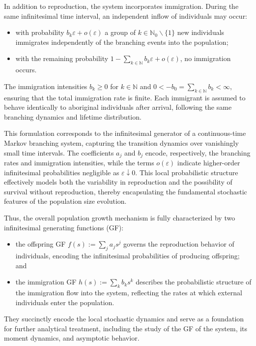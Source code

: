 \documentclass[10pt,reqno]{amsart}
\theoremstyle{definition}
\numberwithin{equation}{section}
\begin{document}
    In addition to reproduction, the system incorporates immigration. During the same infinitesimal
    time interval, an independent inflow of individuals may occur:
\begin{itemize}
\item with probability $b_k\varepsilon+o(\varepsilon)$ a group of $k\in{\mathbb{N}}_0\backslash\{1\}$
        new individuals immigrates independently of the branching events into the population;

\item with the remaining probability $1-\sum_{k\in{\mathbb{N}}}{b_k\varepsilon}+o(\varepsilon)$,
        no immigration occurs.
\end{itemize}
    The immigration intensities $b_k\geq{0}$ for $k\in{\mathbb{N}}$ and $0<-b_0=\sum_{k\in{\mathbb{N}}}{b_k}<\infty$,
    ensuring that the total immigration rate is finite. Each immigrant is assumed to behave identically
    to aboriginal individuals after arrival, following the same branching dynamics and lifetime distribution.

    This formulation corresponds to the infinitesimal generator of a continuous-time Markov branching system,
    capturing the transition dynamics over vanishingly small time intervals. The coefficients $a_j$ and $b_j$
    encode, respectively, the branching rates and immigration intensities, while the terms $o(\varepsilon)$
    indicate higher-order infinitesimal probabilities negligible as $\varepsilon\downarrow{0}$. This local
    probabilistic structure effectively models both the variability in reproduction and the possibility of
    survival without reproduction, thereby encapsulating the fundamental stochastic features of the population size evolution.

    Thus, the overall population growth mechanism is fully characterized by two infinitesimal generating functions (GF):
\begin{itemize}
\item the offspring GF $f(s):=\sum_{j}{a_j s^j}$ governs the reproduction behavior of individuals,
        encoding the infinitesimal probabilities of producing offspring; and

\item the immigration GF $h(s):=\sum_{k}{b_k s^k}$ describes the probabilistic structure of the immigration
        flow into the system, reflecting the rates at which external individuals enter the population.
\end{itemize}
    They succinctly encode the local stochastic dynamics and serve as a foundation for further analytical
    treatment, including the study of the GF of the system, its moment dynamics, and asymptotic behavior.
\end{document}
